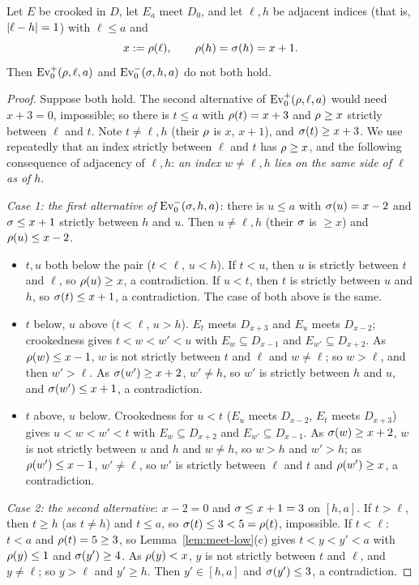 \begin{lemma}[Exclusion]\label{lem:exclusion}
Let $E$ be crooked in $D$, let $E_a$ meet $D_0$, and let $\ell,h$ be adjacent indices (that is, $\left\lvert \ell-h\right\rvert=1$) with $\ell\le a$ and
\[
x:=\rho(\ell),\qquad \rho(h)=\sigma(h)=x+1 .
\]
Then $\mathrm{Ev}^+_0(\rho,\ell,a)$ and $\mathrm{Ev}^-_0(\sigma,h,a)$ do not both hold.
\end{lemma}

\begin{proof}
Suppose both hold. The second alternative of $\mathrm{Ev}^+_0(\rho,\ell,a)$ would need $x+3=0$, impossible; so there is $t\le a$ with
$\rho(t)=x+3$ and $\rho\ge x$ strictly between $\ell$ and $t$. Note $t\ne\ell,h$ (their $\rho$ is $x$, $x+1$), and $\sigma(t)\ge x+3$. We
use repeatedly that an index strictly between $\ell$ and $t$ has $\rho\ge x$, and the following consequence of adjacency of $\ell,h$:
\emph{an index $w\ne\ell,h$ lies on the same side of $\ell$ as of $h$}.

\emph{Case 1: the first alternative of $\mathrm{Ev}^-_0(\sigma,h,a)$}: there is $u\le a$ with $\sigma(u)=x-2$ and $\sigma\le x+1$ strictly between
$h$ and $u$. Then $u\ne\ell,h$ (their $\sigma$ is $\ge x$) and $\rho(u)\le x-2$.
\begin{itemize}
\item $t,u$ both below the pair ($t<\ell$, $u<h$). If $t<u$, then $u$ is strictly between $t$ and $\ell$, so $\rho(u)\ge x$, a contradiction.
If $u<t$, then $t$ is strictly between $u$ and $h$, so $\sigma(t)\le x+1$, a contradiction. The case of both above is the same.
\item $t$ below, $u$ above ($t<\ell$, $u>h$). $E_t$ meets $D_{x+3}$ and $E_u$ meets $D_{x-2}$; crookedness gives $t<w<w'<u$ with
$E_w\subseteq D_{x-1}$ and $E_{w'}\subseteq D_{x+2}$. As $\rho(w)\le x-1$, $w$ is not strictly between $t$ and $\ell$ and $w\ne\ell$; so
$w>\ell$, and then $w'>\ell$. As $\sigma(w')\ge x+2$, $w'\ne h$, so $w'$ is strictly between $h$ and $u$, and $\sigma(w')\le x+1$, a contradiction.
\item $t$ above, $u$ below. Crookedness for $u<t$ ($E_u$ meets $D_{x-2}$, $E_t$ meets $D_{x+3}$) gives $u<w<w'<t$ with $E_w\subseteq
D_{x+2}$ and $E_{w'}\subseteq D_{x-1}$. As $\sigma(w)\ge x+2$, $w$ is not strictly between $u$ and $h$ and $w\ne h$, so $w>h$ and $w'>h$; as
$\rho(w')\le x-1$, $w'\ne\ell$, so $w'$ is strictly between $\ell$ and $t$ and $\rho(w')\ge x$, a contradiction.
\end{itemize}

\emph{Case 2: the second alternative}: $x-2=0$ and $\sigma\le x+1=3$ on $[h,a]$. If $t>\ell$, then $t\ge h$ (as $t\ne h$) and $t\le a$, so
$\sigma(t)\le3<5=\rho(t)$, impossible. If $t<\ell$: $t<a$ and $\rho(t)=5\ge3$, so Lemma~\ref{lem:meet-low}(c) gives $t<y<y'<a$ with $\rho(y)\le1$
and $\sigma(y')\ge4$. As $\rho(y)<x$, $y$ is not strictly between $t$ and $\ell$, and $y\ne\ell$; so $y>\ell$ and $y'\ge h$. Then $y'\in[h,a]$ and
$\sigma(y')\le3$, a contradiction.
\end{proof}

